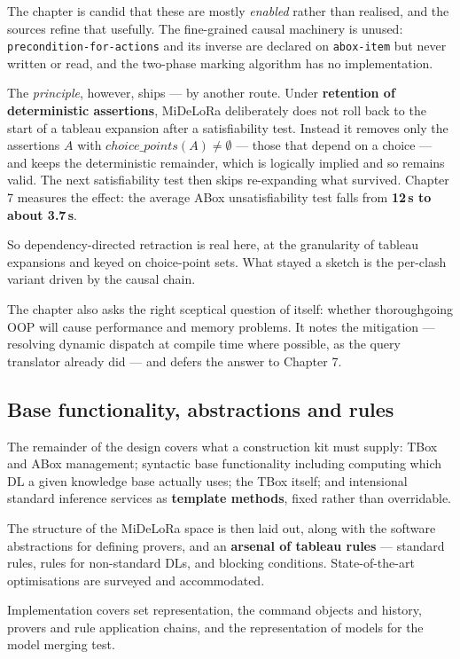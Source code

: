 \documentclass[11pt,a4paper,DIV=12,parskip=half]{scrartcl}
\begin{document}
The chapter is candid that these are mostly \emph{enabled} rather than realised,
and the sources refine that usefully. The fine-grained causal machinery is
unused: \texttt{precondition-for-actions} and its inverse are declared on
\texttt{abox-item} but never written or read, and the two-phase marking
algorithm has no implementation.

The \emph{principle}, however, ships --- by another route. Under
\textbf{retention of deterministic assertions}, MiDeLoRa deliberately does not
roll back to the start of a tableau expansion after a satisfiability test.
Instead it removes only the assertions $A$ with
$\mathit{choice\_points}(A) \neq \emptyset$ --- those that depend on a choice ---
and keeps the deterministic remainder, which is logically implied and so remains
valid. The next satisfiability test then skips re-expanding what survived.
Chapter 7 measures the effect: the average ABox unsatisfiability test falls from
\textbf{12\,s to about 3.7\,s}.

So dependency-directed retraction is real here, at the granularity of tableau
expansions and keyed on choice-point sets. What stayed a sketch is the per-clash
variant driven by the causal chain.

The chapter also asks the right sceptical question of itself: whether thoroughgoing OOP will
cause performance and memory problems. It notes the mitigation --- resolving
dynamic dispatch at compile time where possible, as the query translator already
did --- and defers the answer to Chapter 7.

\subsection{Base functionality, abstractions and rules}

The remainder of the design covers what a construction kit must supply: TBox and
ABox management; syntactic base functionality including computing which DL a
given knowledge base actually uses; the TBox itself; and intensional standard
inference services as \textbf{template methods}, fixed rather than overridable.

The structure of the MiDeLoRa space is then laid out, along with the software
abstractions for defining provers, and an \textbf{arsenal of tableau rules} ---
standard rules, rules for non-standard DLs, and blocking conditions. State-of-the-art
optimisations are surveyed and accommodated.

Implementation covers set representation, the command objects and history,
provers and rule application chains, and the representation of models for the
model merging test.
\end{document}
